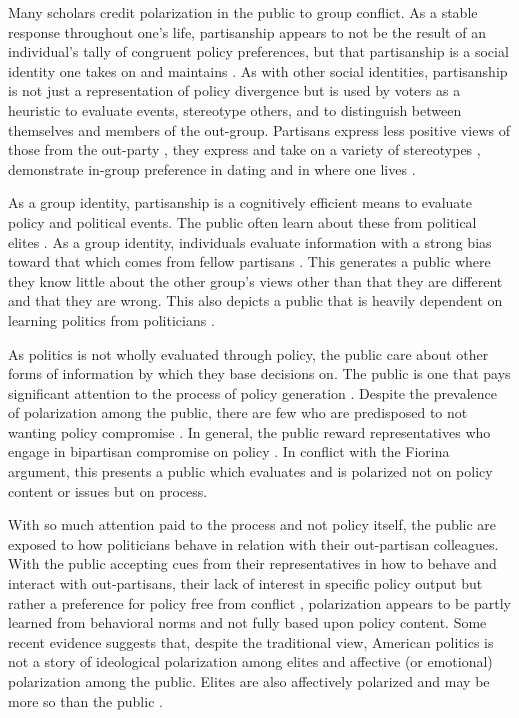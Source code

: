 \documentclass [12pt]{article}
\begin{document}
Many scholars credit polarization in the public to group conflict. As a stable response throughout one's life, partisanship appears to not be the result of an individual's tally of congruent policy preferences, but that partisanship is a social identity one takes on and maintains \citep{green_et-al_2002}. As with other social identities, partisanship is not just a representation of policy divergence but is used by voters as a heuristic to evaluate events, stereotype others, and to distinguish between themselves and members of the out-group. Partisans express less positive views of those from the out-party \citep{iyengar_westwood_2015}, they express and take on a variety of stereotypes \citep{ahler_sood_2018}, demonstrate in-group preference in dating \citep{nicholson_et-al_2016, iyengar_et-al_2019} and in where one lives \citep{liu_et-al_2019}. 

As a group identity, partisanship is a cognitively efficient means to evaluate policy and political events. The public often learn about these from political elites \citep{zaller_1992}. As a group identity, individuals evaluate information with a strong bias toward that which comes from fellow partisans \citep{taber_lodge_2006, taber_lodge_2013,stromback_et-al_2021}.  This generates a public where they know little about the other group's views other than that they are different and that they are wrong. This also depicts a public that is heavily dependent on learning politics from politicians \citep{zaller_1992}. 

As politics is not wholly evaluated through policy, the public care about other forms of information by which they base decisions on. The public is one that pays significant attention to the process of policy generation \citep{hibbing_theiss-morse_2002}. Despite the prevalence of polarization among the public, there are few who are predisposed to not wanting policy compromise \citep{arceneaux_2019}. In general, the public reward representatives who engage in bipartisan compromise on policy \citep{wolak_2020}. In conflict with the Fiorina argument, this presents a public which evaluates and is polarized not on policy content or issues but on process.

With so much attention paid to the process and not policy itself, the public are exposed to how politicians behave in relation with their out-partisan colleagues. With the public accepting cues from their representatives in how to behave and interact with out-partisans, their lack of interest in specific policy output but rather a preference for policy free from conflict \citep{atkinson_2017}, polarization appears to be partly learned from behavioral norms and not fully based upon policy content. Some recent evidence suggests that, despite the traditional view, American politics is not a story of ideological polarization among elites and affective (or emotional) polarization among the public. Elites are also affectively polarized and may be more so than the public \citep{enders_2021}.
\end{document}
